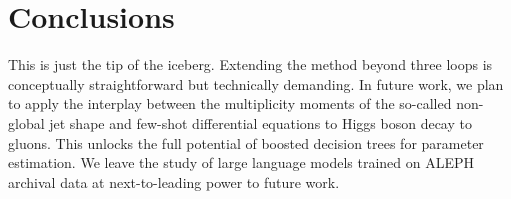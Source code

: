 \section{Conclusions}\label{sec:conclusions}

This is just the tip of the iceberg. Extending the method beyond three
loops is conceptually straightforward but technically demanding. In
future work, we plan to apply the interplay between the multiplicity
moments of the so-called non-global jet shape and few-shot differential
equations to Higgs boson decay to gluons. This unlocks the full
potential of boosted decision trees for parameter estimation. We leave
the study of large language models trained on ALEPH archival data at
next-to-leading power to future work.

